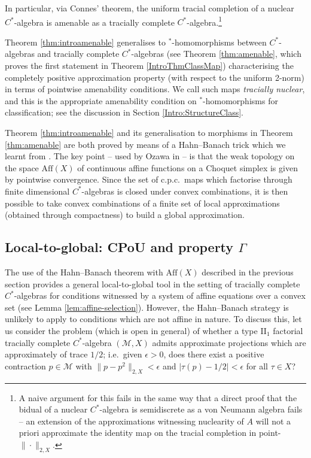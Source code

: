 \documentclass[a4paper,11pt]{amsart}
\theoremstyle{definition}
\numberwithin{equation}{section}
\numberwithin{theorem}{section}
\newcommand{\M}{\mathcal{M}}
\begin{document}
In particular, via Connes' theorem, the uniform tracial completion of a nuclear $C^*$-algebra is {}amenable as a tracially complete $C^*$-algebra.\footnote{A naive argument for this fails in the same way that a direct proof that the bidual of a nuclear $C^*$-algebra is semidiscrete as a von Neumann algebra fails -- an extension of the approximations witnessing nuclearity of $A$ will not a priori approximate the identity map on the tracial completion in point-$\|\cdot\|_{2,X}$.}

Theorem \ref{thm:introamenable} generalises to $^*$-homomorphisms between $C^*$-algebras and tracially complete $C^*$-algebras (see Theorem \ref{thm:amenable}, which proves the first statement in Theorem \ref{IntroThmClassMap}) characterising the completely positive approximation property (with respect to the uniform 2-norm) in terms of pointwise amenability conditions.  We call such maps \emph{tracially nuclear}, and this is the appropriate amenability condition on $^*$-homomorphisms  for classification; see the discussion in Section \ref{Intro:StructureClass}.


Theorem \ref{thm:introamenable} and its generalisation to morphisms in Theorem \ref{thm:amenable} are both proved by means of a Hahn--Banach trick which we learnt from \cite{KranzPhd,GGKNV}.  The key point -- used by Ozawa in \cite{Oz13} -- is that the weak topology on the space $\mathrm{Aff}(X)$ of continuous affine functions on a Choquet simplex is given by pointwise convergence. 
Since the set of c.p.c.\ maps which factorise through finite dimensional $C^*$-algebras is closed under convex combinations, it is then possible to take convex combinations of a finite set of local approximations (obtained through compactness) to build a global approximation.



\subsection{Local-to-global: CPoU and property \texorpdfstring{$\Gamma$}{Gamma}}\label{sec:intro:ltg2}

The use of the Hahn--Banach theorem with $\mathrm{Aff}(X)$ described in the previous section provides a general local-to-global tool in the setting of tracially complete $C^*$-algebras for conditions witnessed by a system of affine equations over a convex set (see Lemma \ref{lem:affine-selection}).  However, the Hahn--Banach strategy is unlikely to apply to conditions which are not affine in nature.  To discuss this, let us consider the problem (which is open in general) of whether a type II$_1$ factorial tracially complete $C^*$-algebra $(\M,X)$ admits approximate projections which are approximately of trace $1/2$; i.e.\ given $\epsilon>0$, does there exist a positive contraction $p\in\M$ with $\|p-p^2\|_{2,X}<\epsilon$ and $|\tau(p)-1/2|<\epsilon$ for all $\tau\in X$?
\end{document}
